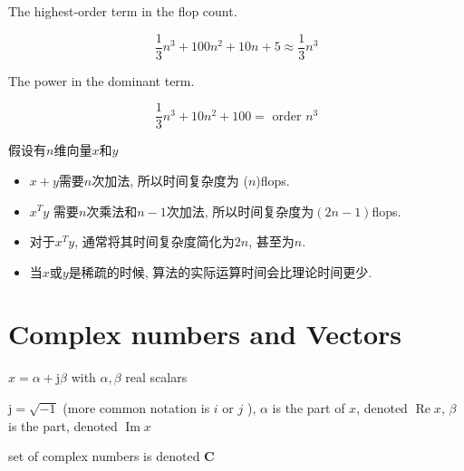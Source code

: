 \begin{definition}
    The highest-order term in the flop count.

\end{definition}

\begin{example}
    $$
\frac{1}{3} n^{3}+100 n^{2}+10 n+5 \approx \frac{1}{3} n^{3}
$$
\end{example}

\begin{definition}[Order]
    The power in the dominant term.
\end{definition}

\begin{example}
    $$
\frac{1}{3} n^{3}+10 n^{2}+100=\text { order } n^{3}
$$
\end{example}


\begin{corollary}
    假设有$n$维向量$x$和$y$

    \begin{itemize}
        \item $x+y$需要$n$次加法, 所以时间复杂度为 ($n$)flops. 
        \item $x^T y$ 需要$n$次乘法和$n - 1$次加法, 所以时间复杂度为$(2n - 1)$flops. 
        \item 对于$x^T y$, 通常将其时间复杂度简化为$2n$, 甚至为$n$. 
        \item 当$x$或$y$是稀疏的时候, 算法的实际运算时间会比理论时间更少. 
    \end{itemize}
\end{corollary}


\section{Complex numbers and Vectors}

\begin{definition}
    $ x=\alpha+\mathrm{j} \beta $ with $ \alpha, \beta $ real scalars

    $ \mathrm{j}=\sqrt{-1} $ (more common notation is $ i $ or $ j $ ), $ \alpha $ is the  part of $ x $, denoted $ \operatorname{Re} x $, $ \beta $ is the  part, denoted $ \operatorname{Im} x $
\end{definition}

\begin{definition}
    set of complex numbers is denoted $ \mathbf{C} $
\end{definition}

